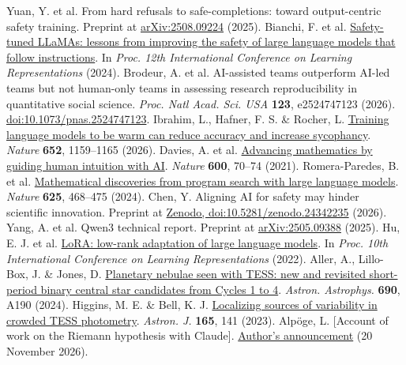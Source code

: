  Yuan, Y. et al. From hard refusals to safe-completions: toward output-centric safety training. Preprint at \href{https://arxiv.org/abs/2508.09224}{arXiv:2508.09224} (2025).
 Bianchi, F. et al. \href{https://proceedings.iclr.cc/paper_files/paper/2024/hash/9178ece87f0a5d6558f49f43ec1e8a1a-Abstract-Conference.html}{Safety-tuned LLaMAs: lessons from improving the safety of large language models that follow instructions}. In \textit{Proc. 12th International Conference on Learning Representations} (2024).
 Brodeur, A. et al. AI-assisted teams outperform AI-led teams but not human-only teams in assessing research reproducibility in quantitative social science. \textit{Proc. Natl Acad. Sci. USA} \textbf{123}, e2524747123 (2026). \href{https://doi.org/10.1073/pnas.2524747123}{doi:10.1073/pnas.2524747123}.
 Ibrahim, L., Hafner, F. S. \& Rocher, L. \href{https://doi.org/10.1038/s41586-026-10410-0}{Training language models to be warm can reduce accuracy and increase sycophancy}. \textit{Nature} \textbf{652}, 1159--1165 (2026).
 Davies, A. et al. \href{https://doi.org/10.1038/s41586-021-04086-x}{Advancing mathematics by guiding human intuition with AI}. \textit{Nature} \textbf{600}, 70--74 (2021).
 Romera-Paredes, B. et al. \href{https://doi.org/10.1038/s41586-023-06924-6}{Mathematical discoveries from program search with large language models}. \textit{Nature} \textbf{625}, 468--475 (2024).
 Chen, Y. Aligning AI for safety may hinder scientific innovation. Preprint at \href{https://doi.org/10.5281/zenodo.24342235}{Zenodo, doi:10.5281/zenodo.24342235} (2026).
 Yang, A. et al. Qwen3 technical report. Preprint at \href{https://arxiv.org/abs/2505.09388}{arXiv:2505.09388} (2025).
 Hu, E. J. et al. \href{https://openreview.net/pdf?id=nZeVKeeFYf9}{LoRA: low-rank adaptation of large language models}. In \textit{Proc. 10th International Conference on Learning Representations} (2022).
 Aller, A., Lillo-Box, J. \& Jones, D. \href{https://doi.org/10.1051/0004-6361/202450942}{Planetary nebulae seen with TESS: new and revisited short-period binary central star candidates from Cycles 1 to 4}. \textit{Astron. Astrophys.} \textbf{690}, A190 (2024).
 Higgins, M. E. \& Bell, K. J. \href{https://doi.org/10.3847/1538-3881/acb20c}{Localizing sources of variability in crowded TESS photometry}. \textit{Astron. J.} \textbf{165}, 141 (2023).
 Alpöge, L. [Account of work on the Riemann hypothesis with Claude]. \href{https://alpo.ge/remark.pdf}{Author's announcement} (20 November 2026).
